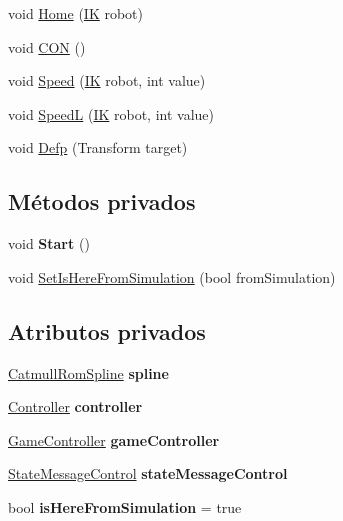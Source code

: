 \begin{DoxyCompactItemize}
\item 
void \mbox{\hyperlink{class_command_control_adae6d4a043a93ded9d51679d78e24ce4}{Home}} (\mbox{\hyperlink{class_i_k}{IK}} robot)
\item 
void \mbox{\hyperlink{class_command_control_a951dd9ecf782547f973c12db75c6f29a}{C\+ON}} ()
\item 
void \mbox{\hyperlink{class_command_control_a7f9634a3a5d21f875edd276f2b06cadb}{Speed}} (\mbox{\hyperlink{class_i_k}{IK}} robot, int value)
\item 
void \mbox{\hyperlink{class_command_control_a05bef86b53aac0d93fea4c255dbe5f86}{SpeedL}} (\mbox{\hyperlink{class_i_k}{IK}} robot, int value)
\item 
void \mbox{\hyperlink{class_command_control_ada99694b0c348a0256faebab0899333b}{Defp}} (Transform target)
\end{DoxyCompactItemize}
\subsection*{Métodos privados}
\begin{DoxyCompactItemize}
\item 
\mbox{\label{class_command_control_a2a867f63b6c89f2864cac9d7126614d5}} 
void {\bfseries Start} ()
\item 
void \mbox{\hyperlink{class_command_control_a5b525d701e0c8d6d57e9c7144aa0df44}{Set\+Is\+Here\+From\+Simulation}} (bool from\+Simulation)
\end{DoxyCompactItemize}
\subsection*{Atributos privados}
\begin{DoxyCompactItemize}
\item 
\mbox{\label{class_command_control_ab72421d3afbbddc7a15ba11aa15e85d8}} 
\mbox{\hyperlink{class_catmull_rom_spline}{Catmull\+Rom\+Spline}} {\bfseries spline}
\item 
\mbox{\label{class_command_control_a38700e69a9a434ca92bb4cbf1aef5545}} 
\mbox{\hyperlink{class_controller}{Controller}} {\bfseries controller}
\item 
\mbox{\label{class_command_control_abb4378198632f261d94a4b6445de3a7b}} 
\mbox{\hyperlink{class_game_controller}{Game\+Controller}} {\bfseries game\+Controller}
\item 
\mbox{\label{class_command_control_a1eef363ceb2574b4e0df8d8d21c02b5a}} 
\mbox{\hyperlink{class_state_message_control}{State\+Message\+Control}} {\bfseries state\+Message\+Control}
\item 
\mbox{\label{class_command_control_a66c19bcb9897bf2f13b5f952d3729a90}} 
bool {\bfseries is\+Here\+From\+Simulation} = true
\end{DoxyCompactItemize}


